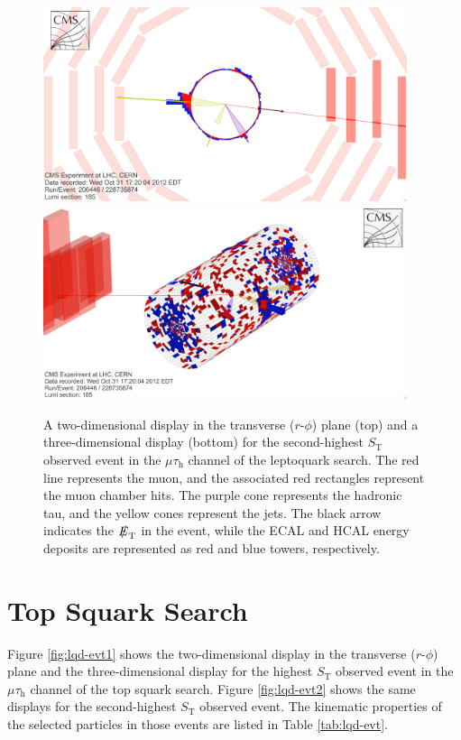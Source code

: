 \documentclass[12pt]{thesis}  %
\newcommand{\tauh}{\ensuremath{\tau_{\text{h}}}\xspace}
\newcommand{\mutau}{\ensuremath{\mu\tauh}\xspace}
\def\eslash{\ensuremath{{\hbox{$E$\kern-0.6em\lower-.05ex\hbox{/}\kern0.10em}}}}
\def\met{\mbox{$\eslash_\text{T}$}\xspace} %
\def\ST{\ensuremath{S_{\text{T}}}\xspace}
\begin{document}
\begin{figure}[hbtp]
\begin{center}
\includegraphics[width=0.95\textwidth]{figures/eventdisplays/LQ_evt2_rphi.png}
\includegraphics[width=0.95\textwidth]{figures/eventdisplays/LQ_evt2_3D.png}
\caption{A two-dimensional display in the transverse ($r$-$\phi$) plane (top) and a three-dimensional display (bottom) for the second-highest \ST observed event in the \mutau channel of the leptoquark search. The red line represents the muon, and the associated red rectangles represent the muon chamber hits. The purple cone represents the hadronic tau, and the yellow cones represent the jets. The black arrow indicates the \met in the event, while the ECAL and HCAL energy deposits are represented as red and blue towers, respectively. }
\label{fig:lq-evt2}
\end{center}
\end{figure}

\clearpage

\section{Top Squark Search}

Figure \ref{fig:lqd-evt1} shows the two-dimensional display in the transverse ($r$-$\phi$) plane and the three-dimensional display for the highest \ST observed event in the \mutau channel of the top squark search. Figure \ref{fig:lqd-evt2} shows the same displays for the second-highest \ST observed event. The kinematic properties of the selected particles in those events are listed in Table \ref{tab:lqd-evt}.
\end{document}
